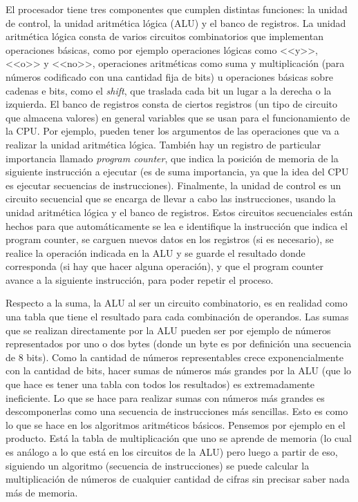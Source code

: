 \documentclass[a4paper, 12pt]{report}
\begin{document}
El procesador tiene tres componentes que cumplen distintas funciones: la unidad de control, la unidad aritmética lógica (ALU) y el banco de registros. La unidad aritmética lógica consta de varios circuitos combinatorios que implementan operaciones básicas, como por ejemplo operaciones lógicas como <<y>>, <<o>> y <<no>>, operaciones aritméticas como suma y multiplicación (para números codificado con una cantidad fija de bits) u operaciones básicas sobre cadenas e bits, como el {\sl shift}, que traslada cada bit un lugar a la derecha o la izquierda. El banco de registros consta de ciertos registros (un tipo de circuito que almacena valores) en general variables que se usan para el funcionamiento de la CPU. Por ejemplo, pueden tener los argumentos de las operaciones que va a realizar la unidad aritmética lógica. También hay un registro de particular importancia llamado {\sl program counter}, que indica la posición de memoria de la siguiente instrucción a ejecutar (es de suma importancia, ya que la idea del CPU es ejecutar secuencias de instrucciones). Finalmente, la unidad de control es un circuito secuencial que se encarga de llevar a cabo las instrucciones, usando la unidad aritmética lógica y el banco de registros. Estos circuitos secuenciales están hechos para que automáticamente se lea e identifique la instrucción que indica el program counter, se carguen nuevos datos en los registros (si es necesario), se realice la operación indicada en la ALU y se guarde el resultado donde corresponda (si hay que hacer alguna operación), y que el program counter avance a la siguiente instrucción, para poder repetir el proceso.

Respecto a la suma, la ALU al ser un circuito combinatorio, es en realidad como una tabla que tiene el resultado para cada combinación de operandos. Las sumas que se realizan directamente por la ALU pueden ser por ejemplo de números representados por uno o dos bytes (donde un byte es por definición una secuencia de 8 bits). Como la cantidad de números representables crece exponencialmente con la cantidad de bits, hacer sumas de números más grandes por la ALU (que lo que hace es tener una tabla con todos los resultados) es extremadamente ineficiente. Lo que se hace para realizar sumas con números más grandes es descomponerlas como una secuencia de instrucciones más sencillas. Esto es como lo que se hace en los algoritmos aritméticos básicos. Pensemos por ejemplo en el producto. Está la tabla de multiplicación que uno se aprende de memoria (lo cual es análogo a lo que está en los circuitos de la ALU) pero luego a partir de eso, siguiendo un algoritmo (secuencia de instrucciones) se puede calcular la multiplicación de números de cualquier cantidad de cifras sin precisar saber nada más de memoria.
\end{document}
